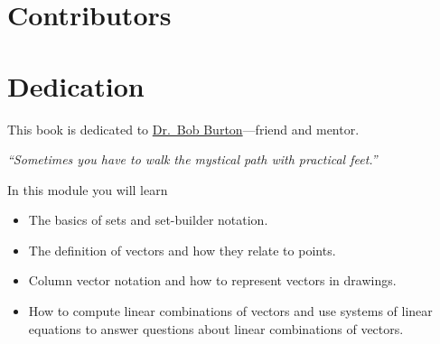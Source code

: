 \makeindex[title=Index of Terms, columns=3]
\makeindex[name=definitions, title=Index of Definitions, columns=3]
\makeindex[name=symbols, title=Index of Symbols, columns=3]












\pagestyle{empty}



\newpage

\begin{bookonly}
	\clearpage
	\hbox{}
	\newpage
	
	\section*{Contributors}
	
	\section*{Dedication}
	\begin{center}
		This book is dedicated to
		\href{https://www.gazettetimes.com/news/local/obituaries/dr-robert-main-burton/article_9c087f07-c005-515a-bb3f-2c9c6a6b7332.html}{\color{blue}Dr.~Bob Burton}---friend and mentor.

		\emph{\large ``Sometimes you have to walk the mystical path with practical feet.''}
	\end{center}
	\newpage
	\mbox{}
	\newpage
\end{bookonly}

\setcounter{page}{1}
\pagestyle{siefken}



\begin{module}\label{module1}

	In this module you will learn
	\begin{itemize}
		\item The basics of sets and set-builder notation.
		\item The definition of vectors and how they relate to points.
		\item Column vector notation and how to represent vectors in drawings.
		\item How to compute linear combinations of vectors and use systems of linear
			equations to answer questions about linear combinations of vectors.
	\end{itemize}

	
	
\end{module}

